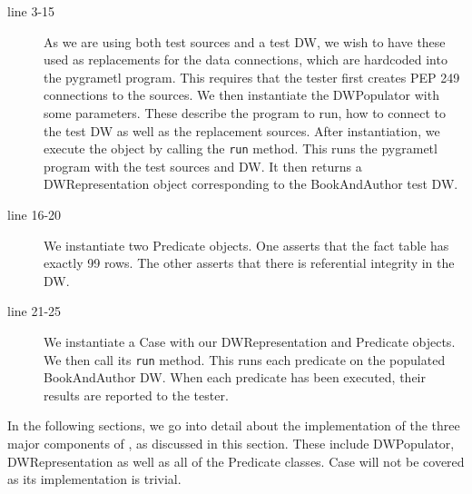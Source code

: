 
\begin{description}
\item[line 3-15] As we are using both test sources and a test DW, we wish to have these used as replacements for the data connections, which are hardcoded into the pygrametl program. This requires that the tester first creates PEP 249 connections to the sources. We then instantiate the DWPopulator with some parameters. These describe the program to run, how to connect to the test DW as well as the replacement sources.  After instantiation, we execute the object by calling the \texttt{run} method. This runs the pygrametl program with the test sources and DW. It then returns a DWRepresentation object corresponding to the BookAndAuthor test DW.

\item[line 16-20] We instantiate two Predicate objects. One asserts that  the fact table has exactly 99 rows. The other asserts that there is referential integrity in the DW.

\item[line 21-25] We instantiate a Case with our DWRepresentation and Predicate objects. We then call its \texttt{run} method. This runs each predicate on the populated BookAndAuthor DW. When each predicate has been executed, their results are reported to the tester.   
\end{description}

In the following sections, we go into detail about the implementation of the three major components of \FW{}, as discussed in this section. These include DWPopulator, DWRepresentation as well as all of the Predicate classes. Case will not be covered as its implementation is trivial.
